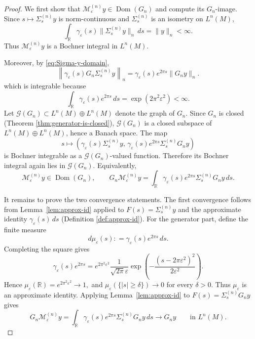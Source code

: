 \documentclass[11pt,a4paper]{article}
\theoremstyle{plain}
\numberwithin{theorem}{section}
\theoremstyle{definition}
\newcommand{\?}{\overset{?}{=}}
\newcommand{\defeq}{\mathrel{\mathop:}=}
\renewcommand{\d}{\delta}	%
\newcommand{\ve}{\varepsilon}
\newcommand{\cM}{\mathcal{M}}
\DeclareMathOperator{\Dom}{Dom}
\begin{document}
\begin{proof}
We first show that \(\mathcal M_\varepsilon^{(n)}y\in\Dom (G_n)\) and compute its
\(G_n\)-image.  Since \(s\mapsto \Sigma_s^{(n)}y\) is norm-continuous and
\(\Sigma_s^{(n)}\) is an isometry on $L^n(M)$,
\[
        \int_{\mathbb R}\gamma_\varepsilon(s)
        \|\Sigma_s^{(n)}y\|_n\,ds
        =
        \|y\|_n
        <\infty .
\]
Thus $\cM_\ve^{(n)}y$ is a Bochner integral in $L^n(M)$.

Moreover, by \eqref{eq:Sigma-y-domain},
\[
        \left\|
        \gamma_\varepsilon(s)G_n\Sigma_s^{(n)}y
        \right\|_n
        =
        \gamma_\varepsilon(s)e^{2\pi s}\|G_ny\|_n .
\]
which is integrable because
\[
        \int_{\mathbb R}\gamma_\varepsilon(s)e^{2\pi s}\,ds
        =
        \exp(2\pi^2\varepsilon^2)
        <\infty .
\]
Let \(\mathcal G(G_n)\subset L^n(M)\oplus L^n(M)\) denote the graph of \(G_n\). 
Since \(G_n\) is closed (Theorem \ref{thm:generator-is-closed}), \(\mathcal G(G_n)\) is a closed subspace of
\(L^n(M)\oplus L^n(M)\), hence a Banach space.  The map
\[
        s\longmapsto
        \left(
            \gamma_\varepsilon(s)\Sigma_s^{(n)}y,\,
            \gamma_\varepsilon(s)e^{2\pi s}\Sigma_s^{(n)}G_ny
        \right)
\]
is Bochner integrable as a \(\mathcal G(G_n)\)-valued function. Therefore its
Bochner integral again lies in \(\mathcal G(G_n)\).  Equivalently,
\begin{equation}\label{eq:M-eps-domain}
    \mathcal M_\varepsilon^{(n)}y\in\Dom (G_n), 
    \qquad 
    G_n\mathcal M_\varepsilon^{(n)}y
    =
    \int_{\mathbb R}
    \gamma_\varepsilon(s)e^{2\pi s}
    \Sigma_s^{(n)}G_ny\,ds .
\end{equation}

It remains to prove the two convergence statements.  
The first convergence follows from Lemma~\ref{lem:approx-id} applied to $F(s)=\Sigma_s^{(n)}y$ and the approximate identity $\gamma_\varepsilon(s)\,ds$ (Definition \ref{def:approx-id}). 
For the generator part, define the finite measure
\[
        d\mu_\varepsilon(s)
        \defeq 
        \gamma_\varepsilon(s)e^{2\pi s}\,ds .
\]
Completing the square gives
\[
        \gamma_\varepsilon(s)e^{2\pi s}
        =
        e^{2\pi^2\varepsilon^2}
        \frac{1}{\sqrt{2\pi}\varepsilon}
        \exp\!\left(
            -\frac{(s-2\pi\varepsilon^2)^2}{2\varepsilon^2}
        \right).
\]
Hence
\(
        \mu_\varepsilon(\mathbb R)
        =
        e^{2\pi^2\varepsilon^2}
        \to 1 ,
\) 
and $\mu_\ve(\{|s|\geq\delta\})\to0$ for every $\d>0$. Thus $\mu_\ve$ is an approximate identity.  Applying Lemma~\ref{lem:approx-id} to $F(s)= \Sigma_s^{(n)} G_n y$ gives
\[
        G_n\mathcal M_\varepsilon^{(n)}y
        =
        \int_{\mathbb R}
        \gamma_\varepsilon(s)e^{2\pi s}
        \Sigma_s^{(n)}G_ny\,ds
        \longrightarrow
        G_ny
        \qquad\text{in }L^n(M).
\]
\end{proof}
\end{document}
